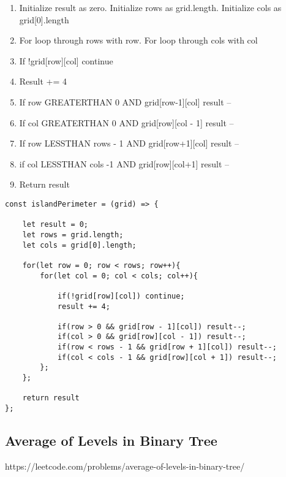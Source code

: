 \documentclass[10pt]{article}
\begin{document}
\begin{enumerate}
	\item Initialize result as zero. Initialize rows as grid.length. Initialize cols as grid[0].length
	\item For loop through rows with row. For loop through cols with col
	\item If !grid[row][col] continue
	\item Result += 4
	\item If row GREATERTHAN 0 AND grid[row-1][col] result --
	\item If col GREATERTHAN 0 AND grid[row][col - 1] result --
	\item If row LESSTHAN rows - 1 AND grid[row+1][col] result --
	\item if col LESSTHAN cols -1 AND grid[row][col+1] result --
	\item Return result
\end{enumerate}

\begin{lstlisting}[title=Solution islandPerimeter, captionpos=t]
const islandPerimeter = (grid) => {
    
    let result = 0;
    let rows = grid.length;
    let cols = grid[0].length;
    
    for(let row = 0; row < rows; row++){
        for(let col = 0; col < cols; col++){
            
            if(!grid[row][col]) continue;
            result += 4;
            
            if(row > 0 && grid[row - 1][col]) result--;
            if(col > 0 && grid[row][col - 1]) result--;
            if(row < rows - 1 && grid[row + 1][col]) result--;
            if(col < cols - 1 && grid[row][col + 1]) result--;
        };
    };
    
    return result
};
\end{lstlisting}

\medskip %










\pagebreak
\medskip   
\subsection {Average of Levels in Binary Tree}
https://leetcode.com/problems/average-of-levels-in-binary-tree/
\end{document}
